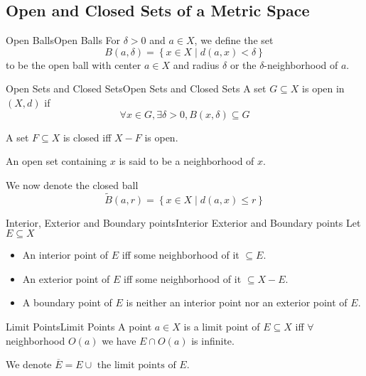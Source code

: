 \documentclass[../main.tex]{subfiles}
\begin{document}
\subsection{Open and Closed Sets of a Metric Space}

\begin{definition}{Open Balls}{Open Balls}
For $\delta>0$ and $a\in X$, we define the set
\begin{equation}
B(a,\delta) = \left\{ x\in X \mid d(a,x)<\delta \right\}
\end{equation}
to be the open ball with center $a\in X$ and radius $\delta$ or the $\delta$-neighborhood of $a$.
\end{definition}
\begin{definition}{Open Sets and Closed Sets}{Open Sets and Closed Sets}
A set $G \subseteq X$ is open in $(X,d)$ if
\begin{equation*}
\forall x\in G, \exists \delta>0, B(x,\delta)\subseteq G
\end{equation*}

A set $F \subseteq X$ is closed iff $X-F$ is open.

An open set containing $x$ is said to be a neighborhood of $x$.
\end{definition}

We now denote the closed ball
\begin{equation}
\tilde{B}(a,r) = \left\{ x\in X\mid d(a,x)\leq r \right\}
\end{equation}

\begin{definition}{Interior, Exterior and Boundary points}{Interior Exterior and Boundary points}
Let $E \subseteq X$
\begin{itemize}
\item An interior point of $E$ iff some neighborhood of it $\subseteq E$.
\item An exterior point of $E$ iff some neighborhood of it $\subseteq X-E$.
\item A boundary point of $E$ is neither an interior point nor an exterior point of $E$.
\end{itemize}
\end{definition}

\begin{definition}{Limit Points}{Limit Points}
A point  $a\in X$ is a limit point of $E \subseteq X$ iff $\forall $ neighborhood $O(a)$ we have $E \cap O(a)$ is infinite.

We denote $\overline{E} = E \cup \text{ the limit points of }E$.
\end{definition}
\end{document}
